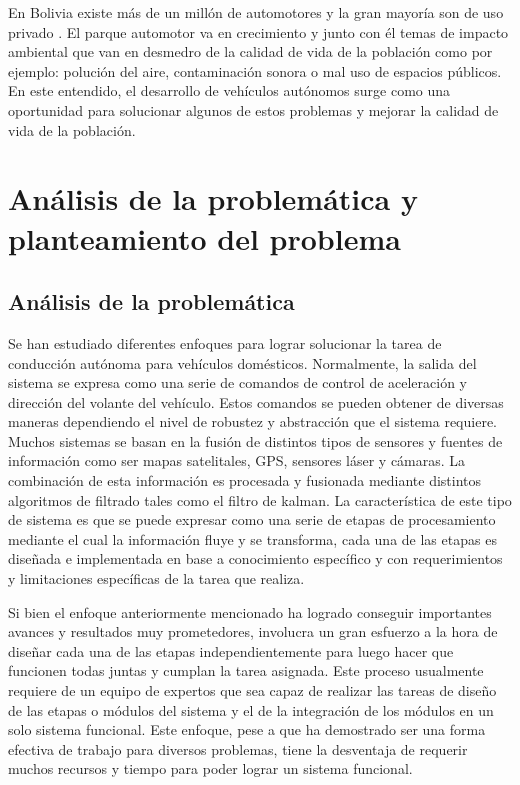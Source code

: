 \documentclass[12pt,letterpaper]{article}
\begin{document}
En Bolivia existe más de un millón de automotores y la gran mayoría son de uso privado \cite{INE2018}. El parque automotor va 
en crecimiento y junto con él temas de impacto ambiental que van en desmedro de la calidad de vida de la población 
como por ejemplo: polución del aire, contaminación sonora o mal uso de espacios públicos. En este entendido, el 
desarrollo de vehículos autónomos surge como una oportunidad para solucionar algunos de estos problemas y mejorar 
la calidad de vida de la población.

\section{Análisis de la problemática y \\
planteamiento del problema}
\subsection{Análisis de la problemática}

Se han estudiado diferentes enfoques para lograr solucionar la tarea de 
conducción autónoma para vehículos domésticos. Normalmente, la salida del 
sistema se expresa como una serie de comandos de control de aceleración y dirección 
del volante del vehículo. Estos comandos se pueden obtener de diversas maneras dependiendo 
el nivel de robustez y abstracción que el sistema requiere. Muchos sistemas 
se basan en la fusión de distintos tipos de sensores y fuentes de información como ser 
mapas satelitales, GPS, sensores láser y cámaras. La combinación de esta información 
es procesada y fusionada mediante distintos algoritmos de filtrado tales como el filtro de kalman. 
La característica de este tipo de sistema es que se puede expresar como una serie de etapas 
de procesamiento mediante el cual la información fluye y se transforma, cada una de las etapas es 
diseñada e implementada en base a conocimiento específico y con requerimientos y limitaciones específicas 
de la tarea que realiza. 

Si bien el enfoque anteriormente mencionado ha logrado conseguir importantes avances y resultados 
muy prometedores, involucra un gran esfuerzo a la hora de diseñar cada una de las etapas independientemente 
para luego hacer que funcionen todas juntas y cumplan la tarea asignada. Este proceso usualmente requiere 
de un equipo de expertos que sea capaz de realizar las tareas de diseño de las etapas o módulos del sistema 
y el de la integración de los módulos en un solo sistema funcional. Este enfoque, pese a que ha demostrado ser 
una forma efectiva de trabajo para diversos problemas, tiene la desventaja de requerir muchos 
recursos y tiempo para poder lograr un sistema funcional. 
%
\end{document}
